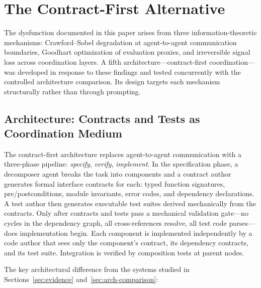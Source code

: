 \documentclass[11pt,a4paper]{article}
\begin{document}
\section{The Contract-First Alternative}
\label{sec:alternative}

The dysfunction documented in this paper arises from three information-theoretic mechanisms: Crawford--Sobel degradation at agent-to-agent communication boundaries, Goodhart optimization of evaluation proxies, and irreversible signal loss across coordination layers. A fifth architecture---contract-first coordination---was developed in response to these findings and tested concurrently with the controlled architecture comparison. Its design targets each mechanism structurally rather than through prompting.

\subsection{Architecture: Contracts and Tests as Coordination Medium}

The contract-first architecture replaces agent-to-agent communication with a three-phase pipeline: \emph{specify}, \emph{verify}, \emph{implement}. In the specification phase, a decomposer agent breaks the task into components and a contract author generates formal interface contracts for each: typed function signatures, pre/postconditions, module invariants, error codes, and dependency declarations. A test author then generates executable test suites derived mechanically from the contracts. Only after contracts and tests pass a mechanical validation gate---no cycles in the dependency graph, all cross-references resolve, all test code parses---does implementation begin. Each component is implemented independently by a code author that sees only the component's contract, its dependency contracts, and its test suite. Integration is verified by composition tests at parent nodes.

The key architectural difference from the systems studied in Sections~\ref{sec:evidence} and~\ref{sec:arch-comparison}:
\end{document}
